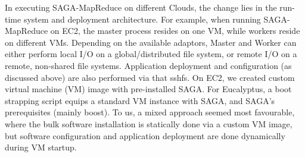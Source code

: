 \documentclass[conference,final]{IEEEtran}
\newcommand{\jhanote}[1]{ {\textcolor{red} { ***SJ: #1 }}}
\newcommand{\jhanote}[1]{}
\newcommand{\sagamapreduce }{SAGA-MapReduce }
\begin{document}
In executing \sagamapreduce on different Clouds, the change lies in
the run-time system and deployment architecture. For example, when
running \sagamapreduce on EC2, the master process resides on one VM,
while workers reside on different VMs.  Depending on the available
adaptors, Master and Worker can either perform local I/O on a
global/distributed file system, or remote I/O on a remote, non-shared
file systems.  %
Application deployment and configuration (as discussed above) are also
performed via that sshfs.  On EC2, we created custom virtual machine
(VM) image with pre-installed SAGA.  For Eucalyptus, a boot strapping
script equips a standard VM instance with SAGA, and SAGA's
prerequisites (mainly boost).  To us, a mixed approach seemed most
favourable, where the bulk software installation is statically done
via a custom VM image, but software configuration and application
deployment are done dynamically during VM startup.




\end{document}
